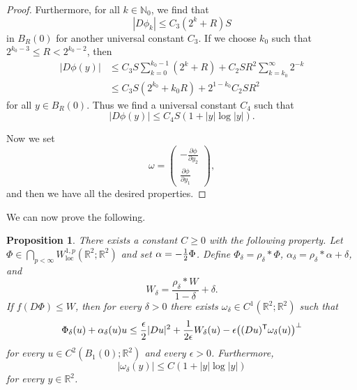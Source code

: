 \documentclass[a4paper]{article}
\newcommand{\R}{\mathbb{R}}
\newcommand{\N}{\mathbb{N}}
\newcommand{\loc}{\mathrm{loc}}
\newcommand{\transpose}{\mathsf{T}}
\let\div\relax\DeclareMathOperator{\div}{div}
\newcommand{\dd}[2]{\frac{\partial #1}{\partial #2}}
\newtheorem{proposition}[theorem]{Proposition}
\theoremstyle{definition}
\theoremstyle{remark}
\begin{document}
\begin{proof}
Furthermore, for all $k \in \N_0$, we find that
\[
|D\phi_k| \le C_3(2^k + R) S
\]
in $B_R(0)$ for another universal constant $C_3$. If we choose $k_0$ such that
$2^{k_0 - 3} \le R < 2^{k_0 - 2}$, then
\[
\begin{split}
|D\phi(y)| & \le C_3 S \sum_{k = 0}^{k_0 - 1} (2^k + R) + C_2 SR^2 \sum_{k = k_0}^\infty 2^{-k} \\
& \le C_3 S (2^{k_0} + k_0 R) + 2^{1 - k_0} C_2 SR^2
\end{split}
\]
for all $y \in B_R(0)$. Thus we find a universal constant $C_4$ such that
\[
|D\phi (y)| \le C_4 S(1 + |y|\log|y|).
\]

Now we set
\[
\omega = \begin{pmatrix} -\dd{\phi}{y_2} \\ \dd{\phi}{y_1} \end{pmatrix},
\]
and then we have all the desired properties.
\end{proof}

We can now prove the following.

\begin{proposition} \label{prp:calibration}
There exists a constant $C \ge 0$ with the following property.
Let $\Phi \in \bigcap_{p < \infty} W_\loc^{1, p}(\R^2; \R^2)$ and set
$\alpha = - \frac{1}{2} \div \Phi$. Define
$\Phi_\delta = \rho_\delta * \Phi$, $\alpha_\delta = \rho_\delta * \alpha + \delta$, and
\[
W_\delta = \frac{\rho_\delta * W}{1 - \delta} + \delta.
\]
If $f(D\Phi) \le W$, then for every $\delta > 0$ there exists
$\omega_\delta \in C^1(\R^2; \R^2)$ such that
\begin{equation} \label{eq:calibration-approximation}
\div \Phi_\delta(u)  + \alpha_\delta(u) \div u \le \frac{\epsilon}{2} |Du|^2 + \frac{1}{2\epsilon} W_\delta(u) - \epsilon \div \bigl((Du)^\transpose \omega_\delta(u)\bigr)^\perp
\end{equation}
for every $u \in C^2(B_1(0); \R^2)$ and every $\epsilon > 0$. Furthermore,
\begin{equation} \label{eq:growth-omega}
|\omega_\delta(y)| \le C(1 + |y| \log |y|)
\end{equation}
for every $y \in \R^2$.
\end{proposition}
\end{document}

